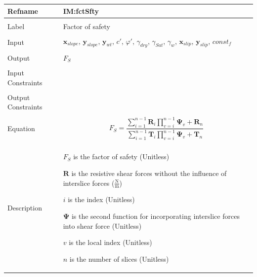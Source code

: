 \documentclass[12pt]{article}
\begin{document}
\noindent \begin{minipage}{\textwidth}
          \begin{tabular}{>{\raggedright}p{}>{\raggedright\arraybackslash}p{}}
          \toprule \textbf{Refname} & \textbf{IM:fctSfty}
          \label{IM:fctSfty}
          \\ \midrule \\
          Label & Factor of safety
          \\ \midrule \\
          Input & ${\mathbf{x}_{slope}}$, ${\mathbf{y}_{slope}}$, ${\mathbf{y}_{wt}}$, $c'$, $φ'$, ${γ_{dry}}$, ${γ_{Sat}}$, ${γ_{w}}$, ${\mathbf{x}_{slip}}$, ${\mathbf{y}_{slip}}$, $const_f$
          \\ \midrule \\
          Output & ${F_{S}}$
          \\ \midrule \\
          Input Constraints & 
          \\ \midrule \\
          Output Constraints & 
          \\ \midrule \\
          Equation & \begin{displaymath}
                     {F_{S}}=\frac{\displaystyle\sum_{i=1}^{n-1}{{\mathbf{R}}_{i} \displaystyle\prod_{v=i}^{n-1}{{\mathbf{Ψ}}_{v}}}+{\mathbf{R}}_{n}}{\displaystyle\sum_{i=1}^{n-1}{{\mathbf{T}}_{i} \displaystyle\prod_{v=i}^{n-1}{{\mathbf{Ψ}}_{v}}}+{\mathbf{T}}_{n}}
                     \end{displaymath}
          \\ \midrule \\
          Description & \begin{symbDescription}
                        \item{${F_{S}}$ is the factor of safety (Unitless)}
                        \item{$\mathbf{R}$ is the resistive shear forces without the influence of interslice forces ($\frac{\text{N}}{\text{m}}$)}
                        \item{$i$ is the index (Unitless)}
                        \item{$\mathbf{Ψ}$ is the second function for incorporating interslice forces into shear force (Unitless)}
                        \item{$v$ is the local index (Unitless)}
                        \item{$n$ is the number of slices (Unitless)}

\end{symbDescription}
\end{tabular}
\end{minipage}
\end{document}
